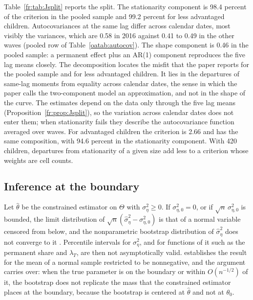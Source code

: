 Table~\ref{fr:tab:Jsplit} reports the split. The stationarity component
is 98.4 percent of the criterion in the pooled sample and 99.2 percent for less advantaged children. Autocovariances at the same lag differ across
calendar dates, most visibly the variances, which are 0.58 in 2016 against 0.41 to 0.49 in the other waves (pooled row of
Table~\ref{oatab:autocov}). The shape component is 0.46 in
the pooled sample: a permanent effect plus an AR(1) component reproduces
the five lag means closely. The decomposition locates the
misfit that the paper reports for the pooled sample and for less advantaged children. It lies in the departures of same-lag moments from equality across calendar dates, the sense in which the paper calls the two-component model an approximation, and not in the shape of the curve. The estimates depend on
the data only through the five lag means
(Proposition~\ref{fr:prop:Jsplit}), so the variation across calendar
dates does not enter them; when stationarity fails they describe the
autocovariance function averaged over waves. For advantaged children the
criterion is 2.66 and has the same composition, with 94.6 percent in the stationarity component. With 420 children, departures from stationarity
of a given size add less to a criterion whose weights are cell counts.

\subsection{Inference at the boundary}

\begin{remark}
\label{fr:prop:boundary}
Let $\hat\theta$ be the constrained estimator on $\Theta$ with
$\sigma^2_\eta \ge 0$. If $\sigma^2_{\eta,0} = 0$, or if
$\sqrt{n}\,\sigma^2_{\eta,0}$ is bounded, the limit distribution of
$\sqrt{n}(\hat\sigma^2_\eta - \sigma^2_{\eta,0})$ is that of a normal
variable censored from below, and the nonparametric bootstrap
distribution of $\hat\sigma^2_\eta$ does not converge to it
\citep{Andrews2000}. Percentile intervals for $\sigma^2_\eta$, and for
functions of it such as the permanent share and $\lambda_T$, are then not
asymptotically valid. \citet{Andrews2000} establishes the result for the mean of a normal
sample restricted to be nonnegative, and the argument carries over: when
the true parameter is on the boundary or within $O(n^{-1/2})$ of it, the
bootstrap does not replicate the mass that the constrained estimator
places at the boundary, because the bootstrap is centered at
$\hat\theta$ and not at $\theta_0$.
\end{remark}


